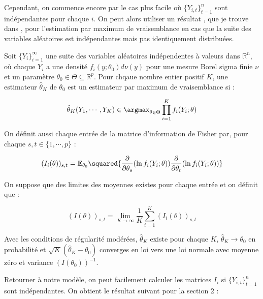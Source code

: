 \documentclass[../main.tex]{subfiles}
\begin{document}
Cependant, on commence encore par le cas plus facile où $\{Y_{i,t}\}_{t=1}^n$ sont indépendantes pour chaque $i$.
On peut alors utiliser un résultat , que je trouve dans \cite{inid_mle}, pour l'estimation par maximum de vraisemblance en cas 
que la suite des variables aléatoires est indépendantes mais pas identiquement distribuées.

\begin{theorem}[Hoadley]
Soit $\{Y_i\}_{i=1}^{\infty}$ une suite des variables aléatoires indépendentes à valeurs dans $\mathbb{R}^{n}$,
où chaque $Y_i$ a une densité $f_i(y; \theta_0) d \nu (y)$ pour une mesure Borel sigma finie $\nu$ 
et un paramètre $\theta_0 \in \Theta \subseteq \mathbb{R}^p$.
Pour chqaue nombre entier positif $K$,
une estimateur $\hat{\theta}_K$ de $\theta_0$ est un estimateur par maximum de vraisemblance si :
    
\begin{equation*}
    \hat{\theta}_K (Y_1, \cdots, Y_K) \in \argmax_{\theta \in \Theta} \prod_{i=1}^K f_i(Y_i; \theta)
\end{equation*}

On définit aussi chaque entrée de la matrice d'information de Fisher par, pour chaque $s,t \in \{1, \cdots, p\}$ :

\begin{equation*}
    (I_i(\theta))_{s,t} = \mathbb{E}_{\theta_0} \squared{\frac{\partial}{\partial \theta_s}(\ln f_i(Y_i; \theta))\frac{\partial}{\partial \theta_t}(\ln f_i(Y_i; \theta))}
\end{equation*}

On suppose que des limites des moyennes existes pour chaque entrée et on définit que :

\begin{equation*}
    (I(\theta))_{s,t} = \lim_{K \to \infty} \frac{1}{K} \sum_{i=1}^K (I_i(\theta))_{s,t}
\end{equation*}

Avec les conditions de régularité modérées, 
$\hat{\theta}_K$ existe pour chaque $K$, $\hat{\theta}_K \to \theta_0$ en probabilité et 
$\sqrt{K}(\hat{\theta}_K - \theta_0)$ converges en loi vers une loi normale avec moyenne zéro et 
variance $(I(\theta_0))^{-1}$.
\end{theorem}

Retourner à notre modèle, on peut facilement calculer les matrices $I_i$ si $\{Y_{i,t}\}_{t=1}^n$ sont indépendantes.
On obtient le résultat suivant pour la section 2 :
\end{document}
